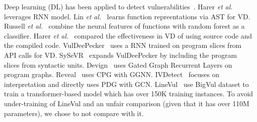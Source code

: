 Deep learning (DL) has been applied
to detect
vulnerabilities~\cite{li2021vulnerability,zhou2019devign,li2021vuldeelocator,li2020automated,chakraborty2021deep,hin2022linevd,scandariato2014predicting,neuhaus2007predicting,shin2010evaluating,neuhaus2009beauty,yamaguchi2012generalized,yamaguchi2011vulnerability}.
Harer {\em et al.}~\cite{harer2018learning} leverages RNN model. Lin
{\em et al.}~\cite{lin2017poster} learns function repreentations via
AST for VD. Russell {\em et al.}~\cite{russell2018automated} combine
the neural features of functions with random forest as
a classifier.
Harer {\em et al.}~\cite{harer2018automated} compared the
effectiveness in VD of using source code and the compiled
code. VulDeePecker~\cite{li2018vuldeepecker} uses a RNN trained on
program slices from API calls for VD. SySeVR~\cite{li2021sysevr}
expands VulDeePecker by including the program slices from 
syntactic units. Devign~\cite{zhou2019devign} uses Gated Graph
Recurrent Layers on program
graphs. Reveal~\cite{chakraborty2020deep} uses CPG with
GGNN. IVDetect~\cite{li2021vulnerability} focuses on interpretation
and directly uses PDG with GCN. LineVul~\cite{linevul-msr22} use
BigVul dataset to train a transformer-based model which has over 150K
training instances. To avoid under-training of LineVul and an unfair
comparison (given that it has over 110M parameters), we chose to not
compare with it.



